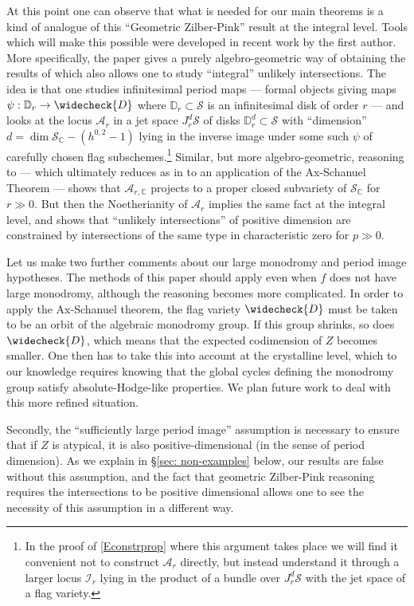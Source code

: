 \documentclass[letter, 11pt]{article}
\theoremstyle{plain}
\theoremstyle{definition}
\newcommand{\IC}{\mathbb{C}}
\newcommand{\ID}{\mathbb{D}}
\newcommand{\che}[1]{\widecheck{#1}}
\newcommand{\<}{\langle}
\renewcommand{\>}{\rangle}
\newcommand{\sI}{\mathcal{I}}
\newcommand{\sS}{\mathcal{S}}
\newcommand{\sA}{\mathcal{A}}
\begin{document}
At this point one can observe that what is needed for our main theorems is a kind of analogue of this ``Geometric Zilber-Pink'' result at the integral level. Tools which will make this possible were developed in recent work \cite{urbanik2022algebraic} by the first author. More specifically, the paper \cite{urbanik2022algebraic} gives a purely algebro-geometric way of obtaining the results of \cite{BKU} which also allows one to study ``integral'' unlikely intersections. The idea is that one studies infinitesimal period maps --- formal objects giving maps $\psi: \ID_r \to \che{D}$ where $\ID_r \subset \sS$ is an infinitesimal disk of order $r$ --- and looks at the locus $\sA_{r}$ in a jet space $J^d_r \sS$ of disks $\ID^d_r \subset \sS$ with ``dimension'' $d = \dim \sS_{\IC} - (h^{0, 2} - 1)$ lying in the inverse image under some such $\psi$ of carefully chosen flag subschemes.\footnote{In the proof of \ref{Econstrprop} where this argument takes place we will find it convenient not to construct $\sA_r$ directly, but instead understand it through a larger locus $\sI_r$ lying in the product of a bundle over $J^d_r \sS$ with the jet space of a flag variety.} Similar, but more algebro-geometric, reasoning to \cite{BKU} --- which ultimately reduces as in \cite{BKU} to an application of the Ax-Schanuel Theorem \cite{zbMATH07066495} --- shows that $\sA_{r,\IC}$ projects to a proper closed subvariety of $\sS_{\IC}$ for $r \gg 0$. But then the Noetherianity of $\sA_{r}$ implies the same fact at the integral level, and shows that ``unlikely intersections'' of positive dimension are constrained by intersections of the same type in characteristic zero for $p \gg 0$. 

\vspace{0.5em}

Let us make two further comments about our large monodromy and period image hypotheses. The methods of this paper should apply even when $f$ does not have large monodromy, although the reasoning becomes more complicated. In order to apply the Ax-Schanuel theorem, the flag variety $\che{D}$ must be taken to be an orbit of the algebraic monodromy group. If this group shrinks, so does $\che{D}$, which means that the expected codimension of $Z$ becomes smaller. One then has to take this into account at the crystalline level, which to our knowledge requires knowing that the global cycles defining the monodromy group satisfy absolute-Hodge-like properties. We plan future work to deal with this more refined situation. 

Secondly, the ``sufficiently large period image'' assumption is necessary to ensure that if $Z$ is atypical, it is also positive-dimensional (in the sense of period dimension). As we explain in \S\ref{sec: non-examples} below, our results are false without this assumption, and the fact that geometric Zilber-Pink reasoning requires the intersections to be positive dimensional allows one to see the necessity of this assumption in a different way. 
\end{document}
